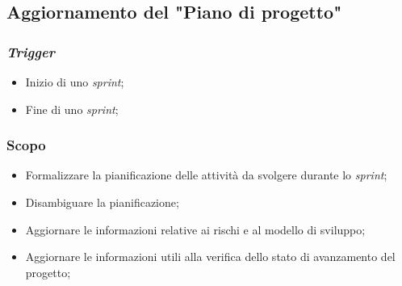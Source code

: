 \subsection{Aggiornamento del "Piano di progetto"}
\label{aggiornare-pdp}

\subsubsection{\textit{Trigger}}
\begin{itemize}
	\item Inizio di uno \textit{sprint};
	\item Fine di uno \textit{sprint};
\end{itemize}

\subsubsection{Scopo}
\begin{itemize}
	\item Formalizzare la pianificazione delle attività da svolgere durante
	      lo \textit{sprint};

	\item Disambiguare la pianificazione;

	\item Aggiornare le informazioni relative ai rischi e al modello di
	      sviluppo;

	\item Aggiornare le informazioni utili alla verifica dello stato di
	      avanzamento del progetto;
\end{itemize}

